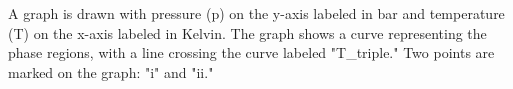 A graph is drawn with pressure (p) on the y-axis labeled in bar and temperature (T) on the x-axis labeled in Kelvin. The graph shows a curve representing the phase regions, with a line crossing the curve labeled "T_triple." Two points are marked on the graph: "i" and "ii."